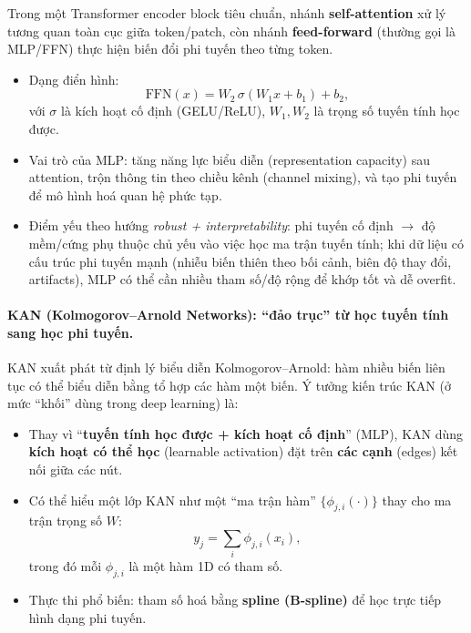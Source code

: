 \documentclass[../DoAn.tex]{subfiles}
\begin{document}
Trong một Transformer encoder block tiêu chuẩn, nhánh \textbf{self-attention} xử lý tương quan toàn cục giữa token/patch,
còn nhánh \textbf{feed-forward} (thường gọi là MLP/FFN) thực hiện biến đổi phi tuyến theo từng token.

\begin{itemize}
  \item Dạng điển hình:
    \begin{equation}
      \mathrm{FFN}(x)=W_2\,\sigma(W_1x+b_1)+b_2,
    \end{equation}
    với $\sigma$ là kích hoạt cố định (GELU/ReLU), $W_1,W_2$ là trọng số tuyến tính học được.

  \item Vai trò của MLP: tăng năng lực biểu diễn (representation capacity) sau attention, trộn thông tin theo chiều kênh (channel mixing),
    và tạo phi tuyến để mô hình hoá quan hệ phức tạp.

  \item Điểm yếu theo hướng \textit{robust + interpretability}: phi tuyến cố định $\rightarrow$ độ mềm/cứng phụ thuộc chủ yếu vào việc học ma trận tuyến tính;
    khi dữ liệu có cấu trúc phi tuyến mạnh (nhiễu biến thiên theo bối cảnh, biên độ thay đổi, artifacts), MLP có thể cần nhiều tham số/độ rộng để khớp tốt
    và dễ overfit.
\end{itemize}

\paragraph{KAN (Kolmogorov--Arnold Networks): ``đảo trục'' từ học tuyến tính sang học phi tuyến.}
KAN xuất phát từ định lý biểu diễn Kolmogorov--Arnold: hàm nhiều biến liên tục có thể biểu diễn bằng tổ hợp các hàm một biến.
Ý tưởng kiến trúc KAN (ở mức ``khối'' dùng trong deep learning) là:

\begin{itemize}
  \item Thay vì ``\textbf{tuyến tính học được + kích hoạt cố định}'' (MLP), KAN dùng \textbf{kích hoạt có thể học} (learnable activation)
    đặt trên \textbf{các cạnh} (edges) kết nối giữa các nút.

  \item Có thể hiểu một lớp KAN như một ``ma trận hàm'' $\{\phi_{j,i}(\cdot)\}$ thay cho ma trận trọng số $W$:
    \begin{equation}
      y_j = \sum_i \phi_{j,i}(x_i),
    \end{equation}
    trong đó mỗi $\phi_{j,i}$ là một hàm 1D có tham số.

  \item Thực thi phổ biến: tham số hoá bằng \textbf{spline (B-spline)} để học trực tiếp hình dạng phi tuyến.
\end{itemize}
\end{document}

